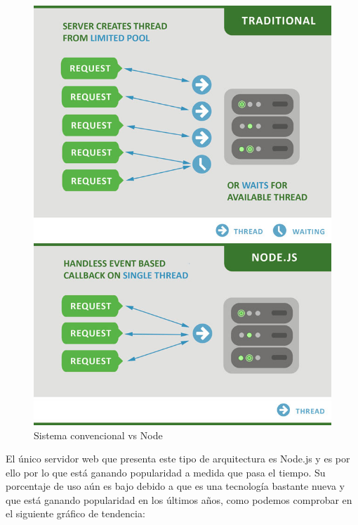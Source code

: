 \begin{figure}[H]
	\centering
	\includegraphics[scale=0.45]{imagenes/traditional-vs-nodejs.jpg}
	\caption{Sistema convencional vs Node \label{fig:figura3}}
\end{figure}



El único servidor web que presenta este tipo de arquitectura es Node.js y es por ello por lo que está
ganando popularidad a medida que pasa el tiempo. Su porcentaje de uso aún es bajo debido a que es una tecnología 
bastante nueva y que está ganando popularidad en los últimos años, como podemos comprobar en el siguiente gráfico
de tendencia:

